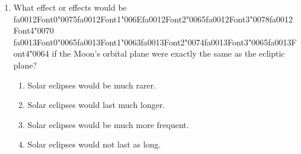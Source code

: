 \documentclass[12pt]{article}
\begin{document}
\begin{enumerate}[label=\arabic*.]
\begin{enumerate}[label=(\alph*)]
    \item Asteroids emit pulsed radiation
    \item Asteroids emit a lot of their own radiation
    \item They reflect enough of the sun's light to make them brighter than most background stars
    \item Asteroids have substantial motion relative to the background stars
\end{enumerate}
\item What effect or effects would be {\csname fa0012Font0\endcsname\char"0075}{\csname fa0012Font1\endcsname\char"006E}{\csname fa0012Font2\endcsname\char"0065}{\csname fa0012Font3\endcsname\char"0078}{\csname fa0012Font4\endcsname\char"0070} {\csname fa0013Font0\endcsname\char"0065}{\csname fa0013Font1\endcsname\char"0063}{\csname fa0013Font2\endcsname\char"0074}{\csname fa0013Font3\endcsname\char"0065}{\csname fa0013Font4\endcsname\char"0064} if the Moon's orbital plane were exactly
the same as the ecliptic plane?
\begin{enumerate}[label=(\alph*)]
    \item Solar eclipses would be much rarer.
    \item Solar eclipses would last much longer.
    \item Solar eclipses would be much more frequent.
    \item Solar eclipses would not last as long.
\end{enumerate}
\end{enumerate}
\end{document}
